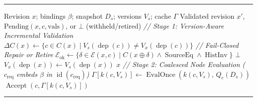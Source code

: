 \par\hrule\smallskip
\captionsetup*{type=algorithm}
\caption{}
\label{alg:maintenance}
\small
\begin{algorithmic}[1]
\Require Revision $x$; bindings $\beta$; snapshot $D_s$; versions $V_s$; cache $\Gamma$
\Ensure Validated revision $x'$, $\text{Pending}(x, c, \text{vals})$, or $\bot$ (withheld/retired)
  \Statex \hspace{\algorithmicindent}\textit{// Stage 1: Version-Aware Incremental Validation}
  \State $\Delta C(x) \gets \{c \in C(x) \mid V_s(\operatorname{dep}(c)) \neq V_x(\operatorname{dep}(c))\}$
      \Statex \hspace{\algorithmicindent}\hspace{\algorithmicindent}\hspace{\algorithmicindent}\textit{// Fail-Closed Repair or Retire}
      \State $\mathcal E_{\mathrm{ok}} \gets \{\delta \in \mathcal E(x, c) \mid C(x \oplus \delta) \land \operatorname{SourceEq} \land \operatorname{HistInv}\}$
      \State \Return $\bot$
    \EndIf
  \EndFor
  \State $V_x(\operatorname{dep}(x)) \gets V_s(\operatorname{dep}(x))$
  \EndFor
  \State \Return $x$
\EndFunction
{}
  \Statex \hspace{\algorithmicindent}\textit{// Stage 2: Coalesced Node Evaluation ($c_{\mathrm{req}}$ embeds $\beta$ in $\operatorname{id}(c_{\mathrm{req}})$)}
    \State $\Gamma[k(c, V_s)] \gets \operatorname{EvalOnce}(k(c, V_s),\, Q_c(D_s))$
  \EndIf
  \State \Return $\operatorname{Accept}(c, \Gamma[k(c, V_s)])$
\EndFunction
\end{algorithmic}
\par\smallskip\hrule
